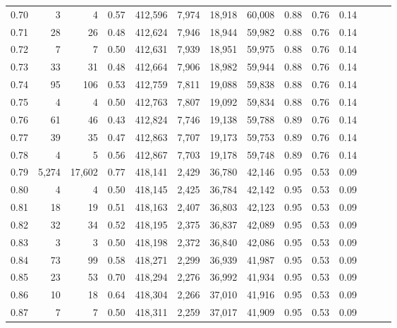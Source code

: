 \begin{tabular}{rrrrrrrrrrrrrr}
0.70 &       3 &       4 &  0.57 &  412,596 &    7,974 &  18,918 &  60,008 &  0.88 &  0.76 &      0.14 \\
0.71 &      28 &      26 &  0.48 &  412,624 &    7,946 &  18,944 &  59,982 &  0.88 &  0.76 &      0.14 \\
0.72 &       7 &       7 &  0.50 &  412,631 &    7,939 &  18,951 &  59,975 &  0.88 &  0.76 &      0.14 \\
0.73 &      33 &      31 &  0.48 &  412,664 &    7,906 &  18,982 &  59,944 &  0.88 &  0.76 &      0.14 \\
0.74 &      95 &     106 &  0.53 &  412,759 &    7,811 &  19,088 &  59,838 &  0.88 &  0.76 &      0.14 \\
0.75 &       4 &       4 &  0.50 &  412,763 &    7,807 &  19,092 &  59,834 &  0.88 &  0.76 &      0.14 \\
0.76 &      61 &      46 &  0.43 &  412,824 &    7,746 &  19,138 &  59,788 &  0.89 &  0.76 &      0.14 \\
0.77 &      39 &      35 &  0.47 &  412,863 &    7,707 &  19,173 &  59,753 &  0.89 &  0.76 &      0.14 \\
0.78 &       4 &       5 &  0.56 &  412,867 &    7,703 &  19,178 &  59,748 &  0.89 &  0.76 &      0.14 \\
0.79 &   5,274 &  17,602 &  0.77 &  418,141 &    2,429 &  36,780 &  42,146 &  0.95 &  0.53 &      0.09 \\
0.80 &       4 &       4 &  0.50 &  418,145 &    2,425 &  36,784 &  42,142 &  0.95 &  0.53 &      0.09 \\
0.81 &      18 &      19 &  0.51 &  418,163 &    2,407 &  36,803 &  42,123 &  0.95 &  0.53 &      0.09 \\
0.82 &      32 &      34 &  0.52 &  418,195 &    2,375 &  36,837 &  42,089 &  0.95 &  0.53 &      0.09 \\
0.83 &       3 &       3 &  0.50 &  418,198 &    2,372 &  36,840 &  42,086 &  0.95 &  0.53 &      0.09 \\
0.84 &      73 &      99 &  0.58 &  418,271 &    2,299 &  36,939 &  41,987 &  0.95 &  0.53 &      0.09 \\
0.85 &      23 &      53 &  0.70 &  418,294 &    2,276 &  36,992 &  41,934 &  0.95 &  0.53 &      0.09 \\
0.86 &      10 &      18 &  0.64 &  418,304 &    2,266 &  37,010 &  41,916 &  0.95 &  0.53 &      0.09 \\
0.87 &       7 &       7 &  0.50 &  418,311 &    2,259 &  37,017 &  41,909 &  0.95 &  0.53 &      0.09 \\

\end{tabular}
